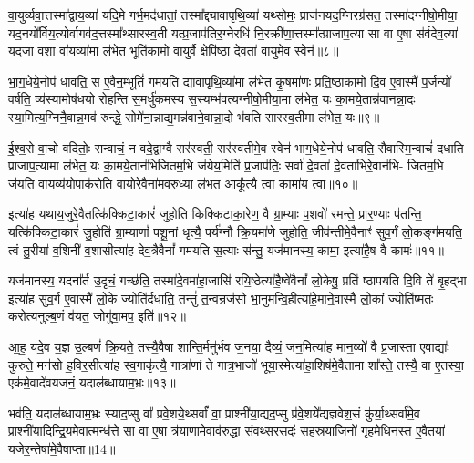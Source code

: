 वा॒युर्व्यवा॒त्तस्मा᳚द्वाय॒व्या॑ यदि॒मे गर्भ॒मद॑धातां॒ तस्मा᳚द्द्यावापृथि॒व्या॑ यथ्सोमः॒ प्राज॑नयद॒ग्निरग्र॑सत॒ तस्मा॑दग्नीषो॒मीया॒ यद॒नयो᳚र्विय॒त्योर्वागव॑द॒त्तस्मा᳚थ्सारस्व॒ती यत्प्र॒जाप॑तिर॒ग्नेरधि॑ नि॒रक्री॑णा॒त्तस्मा᳚त्प्राजाप॒त्या सा वा ए॒षा स॑र्वदेव॒त्या॑ यद॒जा व॒शा वा॑य॒व्या॑मा ल॑भेत॒ भूति॑कामो वा॒युर्वै क्षेपि॑ष्ठा दे॒वता॑ वा॒युमे॒व स्वेन॑॥८॥

भा॒ग॒धेये॒नोप॑ धावति॒ स ए॒वैन॒म्भूतिं॑ गमयति द्यावापृथि॒व्या॑मा ल॑भेत कृ॒षमा॑णः प्रति॒ष्ठाका॑मो दि॒व ए॒वास्मै॑ प॒र्जन्यो॑ वर्\mbox{}षति॒ व्य॑स्यामोष॑धयो रोहन्ति स॒मर्धु॑कमस्य स॒स्यम्भ॑वत्यग्नीषो॒मीया॒मा ल॑भेत॒ यः का॒मये॒तान्न॑वानन्ना॒दः स्या॒मित्य॒ग्निनै॒वान्न॒मव॑ रुन्द्धे॒ सोमे॑ना॒न्नाद्य॒मन्न॑वाने॒वान्ना॒दो भ॑वति सारस्व॒तीमा ल॑भेत॒ यः॥९॥

ई॒श्व॒रो वा॒चो वदि॑तोः॒ सन्वाचं॒ न वदे॒द्वाग्वै सर॑स्वती॒ सर॑स्वतीमे॒व स्वेन॑ भाग॒धेये॒नोप॑ धावति॒ सैवास्मि॒न्वाचं॑ दधाति प्राजाप॒त्यामा ल॑भेत॒ यः का॒मये॒तान॑भिजितम॒भि ज॑येय॒मिति॑ प्र॒जाप॑तिः॒ सर्वा॑ दे॒वता॑ दे॒वता॑भिरे॒वान॑भि- जितम॒भि ज॑यति वाय॒व्य॑यो॒पाक॑रोति वा॒योरे॒वैना॑मव॒रुध्या ल॑भत॒ आकू᳚त्यै त्वा॒ कामा॑य त्वा॥१०॥

इत्या॑ह यथाय॒जुरे॒वैतत्कि॑क्किटा॒कारं॑ जुहोति किक्किटाका॒रेण॒ वै ग्रा॒म्याः प॒शवो॑ रमन्ते॒ प्रार॒ण्याः प॑तन्ति॒ यत्कि॑क्किटा॒कारं॑ जु॒होति॑ ग्रा॒म्याणां᳚ पशू॒नां धृत्यै॒ पर्य॑ग्नौ क्रि॒यमा॑णे जुहोति॒ जीव॑न्तीमे॒वैनाꣳ॑ सुव॒र्गं लो॒कङ्ग॑मयति॒ त्वं तु॒रीया॑ व॒शिनी॑ व॒शासीत्या॑ह देव॒त्रैवैनां᳚ गमयति स॒त्याः स॑न्तु॒ यज॑मानस्य॒ कामा॒ इत्या॑है॒ष वै कामः॑॥११॥

यज॑मानस्य॒ यदना᳚र्त उ॒दृचं॒ गच्छ॑ति॒ तस्मा॑दे॒वमा॑हा॒जासि॑ रयि॒ष्ठेत्या॑है॒ष्वे॑वैनां᳚ लो॒केषु॒ प्रति॑ ष्ठापयति दि॒वि ते॑ बृ॒हद्भा इत्या॑ह सुव॒र्ग ए॒वास्मै॑ लो॒के ज्योति॑र्दधाति॒ तन्तुं॑ त॒न्वन्रज॑सो भा॒नुमन्वि॒हीत्या॑हे॒माने॒वास्मै॑ लो॒कां ज्योति॑ष्मतः करोत्यनुल्ब॒णं व॑यत॒ जोगु॑वा॒मप॒ इति॑॥१२॥

आ॒ह॒ यदे॒व य॒ज्ञ उ॒ल्बणं॑ क्रि॒यते॒ तस्यै॒वैषा शान्ति॒र्मनु॑र्भव ज॒नया॒ दैव्यं॒ जन॒मित्या॑ह मान॒व्यो॑ वै प्र॒जास्ता ए॒वाद्याः᳚ कुरुते॒ मन॑सो ह॒विर॒सीत्या॑ह स्व॒गाकृ॑त्यै॒ गात्रा॑णां ते गात्र॒भाजो॑ भूया॒स्मेत्या॑हा॒शिष॑मे॒वैतामा शा᳚स्ते॒ तस्यै॒ वा ए॒तस्या॒ एक॑मे॒वादे॑वयजनं॒ यदाल॑ब्धायाम॒भ्रः॥१३॥

भव॑ति॒ यदाल॑ब्धायाम॒भ्रः स्याद॒प्सु वा᳚ प्रवे॒शये॒थ्सर्वां᳚ वा॒ प्राश्नी॑या॒द्यद॒प्सु प्र॑वे॒शये᳚द्यज्ञवेश॒सं कु॑र्या॒थ्सर्वा॑मे॒व प्राश्नी॑यादिन्द्रि॒यमे॒वात्मन्ध॑त्ते॒ सा वा ए॒षा त्र॑या॒णामे॒वाव॑रुद्धा संवथ्सर॒सदः॑ सहस्रया॒जिनो॑ गृहमे॒धिन॒स्त ए॒वैतया॑ यजेर॒न्तेषा॑मे॒वैषाप्ता॥14॥

{\anuvakamend[{यथ्स्वेन॑ सारस्व॒तीमा ल॑भेत॒ यः कामा॑य त्वा॒ कामो\-ऽप॒ इत्य॒भ्रो द्विच॑त्वारिꣳशच्च॥३॥}]}

